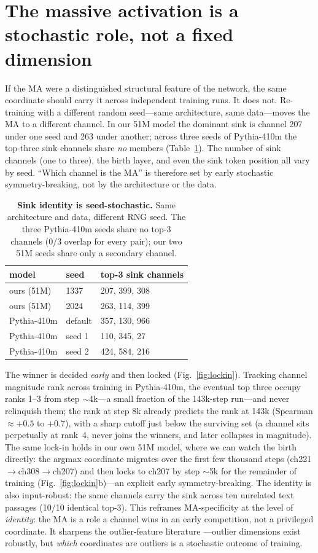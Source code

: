 \documentclass[11pt]{article}
\begin{document}
\section{The massive activation is a stochastic role, not a fixed dimension}\label{sec:stochastic}
If the MA were a distinguished structural feature of the network, the same coordinate
should carry it across independent training runs. It does not. Re-training with a
different random seed---same architecture, same data---moves the MA to a different
channel. In our 51M model the dominant sink is channel 207 under one seed and 263
under another; across three seeds of Pythia-410m the top-three sink channels share
\emph{no} members (Table~\ref{tab:seed}). The number of sink channels (one to three),
the birth layer, and even the sink token position all vary by seed. ``Which channel
is the MA'' is therefore set by early stochastic symmetry-breaking, not by the
architecture or the data.

\begin{table}[t]\centering\small
\begin{tabular}{lll}
\toprule
model & seed & top-3 sink channels\\
\midrule
ours (51M) & 1337 & 207, 399, 308\\
ours (51M) & 2024 & 263, 114, 399\\
Pythia-410m & default & 357, 130, 966\\
Pythia-410m & seed 1 & 110, 345, 27\\
Pythia-410m & seed 2 & 424, 584, 216\\
\bottomrule
\end{tabular}
\caption{\textbf{Sink identity is seed-stochastic.} Same architecture and data,
different RNG seed. The three Pythia-410m seeds share no top-3 channels (0/3 overlap
for every pair); our two 51M seeds share only a secondary channel.}\label{tab:seed}
\end{table}

The winner is decided \emph{early} and then locked (Fig.~\ref{fig:lockin}). Tracking
channel magnitude rank across training in Pythia-410m, the eventual top three occupy
ranks 1--3 from step $\sim$4k---a small fraction of the 143k-step run---and never
relinquish them; the rank at step 8k already predicts the rank at 143k (Spearman
$\approx+0.5$ to $+0.7$), with a sharp cutoff just below the surviving set (a channel
sits perpetually at rank~4, never joins the winners, and later collapses in
magnitude). The same lock-in holds in our own 51M model, where we can watch the
birth directly: the argmax coordinate migrates over the first few thousand steps
(ch221$\to$ch308$\to$ch207) and then locks to ch207 by step $\sim$5k for the
remainder of training (Fig.~\ref{fig:lockin}b)---an explicit early
symmetry-breaking. The identity is also input-robust: the same channels carry the
sink across ten unrelated text passages (10/10 identical top-3). This reframes
MA-specificity at the level of \emph{identity}: the MA is a role a channel wins in an
early competition, not a privileged coordinate. It sharpens the outlier-feature
literature
\citep{dettmers2022llmint8,kovaleva2021bert}---outlier dimensions exist robustly, but
\emph{which} coordinates are outliers is a stochastic outcome of training.
\end{document}
